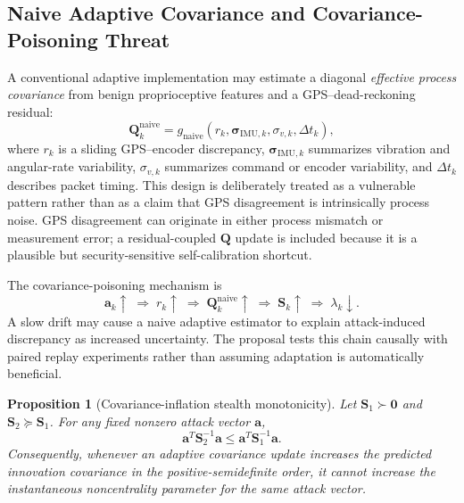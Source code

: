 \documentclass[11pt,a4paper]{article}
\newtheorem{proposition}{Proposition}
\begin{document}
\subsection{Naive Adaptive Covariance and Covariance-Poisoning Threat}
A conventional adaptive implementation may estimate a diagonal \emph{effective process covariance} from benign proprioceptive features and a GPS--dead-reckoning residual:
\begin{equation}
\mathbf{Q}^{\mathrm{naive}}_k=g_{\mathrm{naive}}\left(r_k,\boldsymbol{\sigma}_{\mathrm{IMU},k},\sigma_{v,k},\Delta t_k\right),
\label{eq:naive-q}
\end{equation}
where $r_k$ is a sliding GPS--encoder discrepancy, $\boldsymbol{\sigma}_{\mathrm{IMU},k}$ summarizes vibration and angular-rate variability, $\sigma_{v,k}$ summarizes command or encoder variability, and $\Delta t_k$ describes packet timing. This design is deliberately treated as a vulnerable pattern rather than as a claim that GPS disagreement is intrinsically process noise. GPS disagreement can originate in either process mismatch or measurement error; a residual-coupled $\mathbf{Q}$ update is included because it is a plausible but security-sensitive self-calibration shortcut.

The covariance-poisoning mechanism is
\begin{equation}
\mathbf{a}_k \uparrow \;\Rightarrow\; r_k \uparrow \;\Rightarrow\; \mathbf{Q}^{\mathrm{naive}}_k \uparrow \;\Rightarrow\; \mathbf{S}_k \uparrow \;\Rightarrow\; \lambda_k \downarrow.
\label{eq:poisoning-chain}
\end{equation}
A slow drift may cause a naive adaptive estimator to explain attack-induced discrepancy as increased uncertainty. The proposal tests this chain causally with paired replay experiments rather than assuming adaptation is automatically beneficial.

\begin{proposition}[Covariance-inflation stealth monotonicity]
Let $\mathbf{S}_1\succ\mathbf{0}$ and $\mathbf{S}_2\succeq\mathbf{S}_1$. For any fixed nonzero attack vector $\mathbf{a}$,
\begin{equation}
\mathbf{a}^{T}\mathbf{S}_2^{-1}\mathbf{a}
\leq
\mathbf{a}^{T}\mathbf{S}_1^{-1}\mathbf{a}.
\label{eq:covariance-monotonicity}
\end{equation}
Consequently, whenever an adaptive covariance update increases the predicted innovation covariance in the positive-semidefinite order, it cannot increase the instantaneous noncentrality parameter for the same attack vector.
\end{proposition}
\end{document}
